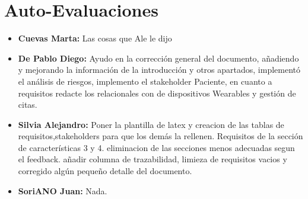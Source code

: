 \documentclass{article}
\begin{document}
\section{Auto-Evaluaciones}
\begin{itemize}
	\item \textbf{Cuevas Marta:} Las cosas que Ale le dijo
	\item \textbf{De Pablo Diego:} Ayudo en la corrección general del documento, añadiendo y mejorando la información de la introducción y otros apartados, implementó el análisis de riesgos, implemento el stakeholder Paciente, en cuanto a requisitos  redacte los relacionales con de dispositivos Wearables y gestión de citas.
	\item \textbf{Silvia Alejandro:} Poner la plantilla de latex y creacion de las tablas de requisitos,stakeholders para que los demás la rellenen. Requisitos de la sección de características 3 y 4. eliminacion de las secciones menos adecuadas segun el feedback. añadir columna de trazabilidad, limieza de requisitos vacios y corregido algún pequeño detalle del documento.
	\item \textbf{SoriANO Juan:} Nada.
\end{itemize}
\end{document}
